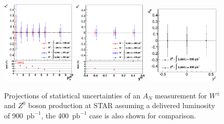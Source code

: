 \documentclass[12pt]{article}
\begin{document}
\begin{figure}[htbp]
  \centering
  \includegraphics[width=0.32\textwidth]{images/projections/hd_WAsym2016ProjPt_zoom.eps}
  \includegraphics[width=0.32\textwidth]{images/projections/hd_WAsym2016ProjRap_zoom.eps}
  \includegraphics[width=0.32\textwidth]{images/projections/hd_Z0Asym2016ProjRap.eps}
  \caption{Projections of statistical uncertainties of an $A_{N}$ measurement for  $W^{\pm}$ and $Z^{0}$ boson production at STAR assuming a delivered luminosity of 900~$\text{pb}^{-1}$, the 400~$\text{pb}^{-1}$ case is also shown for comparison.}
  \label{Fig:Run16Proj}
\end{figure}
  
\end{document}
